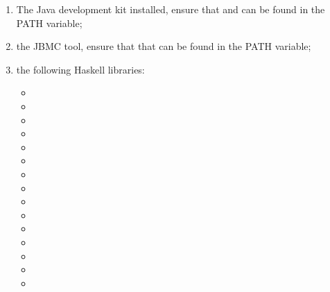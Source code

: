 \begin{enumerate}
    \item The Java development kit installed, ensure that  and
     can be found in the PATH variable;
    \item the JBMC tool, ensure that that  can be found in the PATH 
    variable;
    \item the following Haskell libraries:
    \begin{multicols}{3}
        \begin{itemize}
            \item {}
            \item {}
            \item {}
            \item {}
            \item {}
            \item {}
            \item {}
            \item {}
            \item {}
            \item {}
            \item {}
            \item {}
            \item {}
            \item {}
            \item {}
        \end{itemize}
    \end{multicols}
\end{enumerate}
